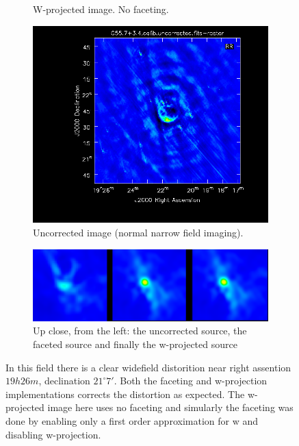 \begin{figure}[h!]
\begin{subfigure}[b]{0.49\textwidth}
    \caption{W-projected image. No faceting.}
 \end{subfigure}
 \begin{subfigure}[b]{0.49\textwidth}
    \centering
    \includegraphics[width=\textwidth]{images/validation/uncorrected.png}
    \caption{Uncorrected image (normal narrow field imaging).}
 \end{subfigure}
 \begin{subfigure}[b]{0.49\textwidth}
    \centering
    \includegraphics[width=\textwidth]{images/validation/corrections.png}
    \caption{Up close, from the left: the uncorrected source, the faceted source and 
    finally the w-projected source}
 \end{subfigure}
 \caption[Supernova reminant G55.7+3.4]{In this field there is a clear widefield distorition near
 right assention $19h26m$, declination $21^\circ7'$. Both the faceting and w-projection
 implementations corrects the distortion as expected. The w-projected image here uses no faceting
 and simularly the faceting was done by enabling only a first order approximation for w and disabling
 w-projection.}
 \label{FIG_SUPERNOVA}
\end{figure}